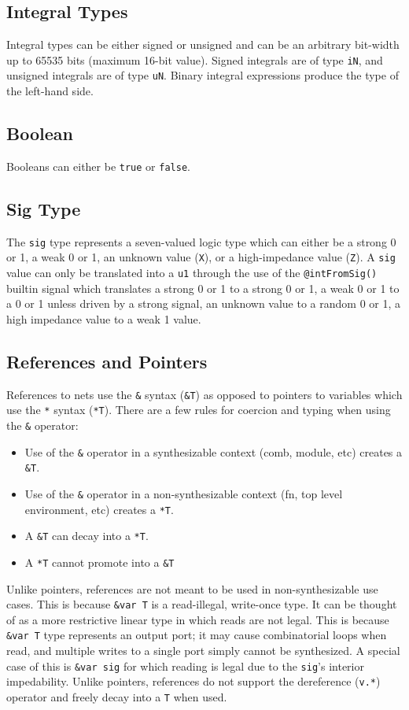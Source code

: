 \documentclass[10pt]{article}
\begin{document}
\subsection{Integral Types}
Integral types can be either signed or unsigned and can be an arbitrary bit-width up to 65535 bits
(maximum 16-bit value). Signed integrals are of type \verb|iN|, and unsigned integrals are of type
\verb|uN|. Binary integral expressions produce the type of the left-hand side.

\subsection{Boolean}
Booleans can either be \verb|true| or \verb|false|.

\subsection{Sig Type}
The \verb|sig| type represents a seven-valued logic type which can either be a strong 0 or 1, a weak
0 or 1, an unknown value (\verb|X|), or a high-impedance value (\verb|Z|). A \verb|sig| value can
only be translated into a \verb|u1| through the use of the \verb|@intFromSig()| builtin signal
which translates a strong 0 or 1 to a strong 0 or 1, a weak 0 or 1 to a 0 or 1 unless driven by
a strong signal, an unknown value to a random 0 or 1, a high impedance value to a weak 1 value.

\subsection{References and Pointers}
References to nets use the \verb|&| syntax (\verb|&T|) as opposed to pointers to variables which use
the \verb|*| syntax (\verb|*T|). There are a few rules for coercion and typing when using the
\verb|&| operator:

\begin{itemize}
	\item Use of the \verb|&| operator in a synthesizable context (comb, module, etc) creates a \verb|&T|.
	\item Use of the \verb|&| operator in a non-synthesizable context (fn, top level environment, etc) creates a \verb|*T|.
	\item A \verb|&T| can decay into a \verb|*T|.
	\item A \verb|*T| cannot promote into a \verb|&T|
\end{itemize}

Unlike pointers, references are not meant to be used in non-synthesizable use cases. This is because
\verb|&var T| is a read-illegal, write-once type. It can be thought of as a more restrictive linear
type in which reads are not legal. This is because \verb|&var T| type represents an output port; it
may cause combinatorial loops when read, and multiple writes to a single port simply cannot be
synthesized. A special case of this is \verb|&var sig| for which reading is legal due to the
\verb|sig|'s interior impedability. Unlike pointers, references do not support the dereference
(\verb|v.*|) operator and freely decay into a \verb|T| when used.
\end{document}

